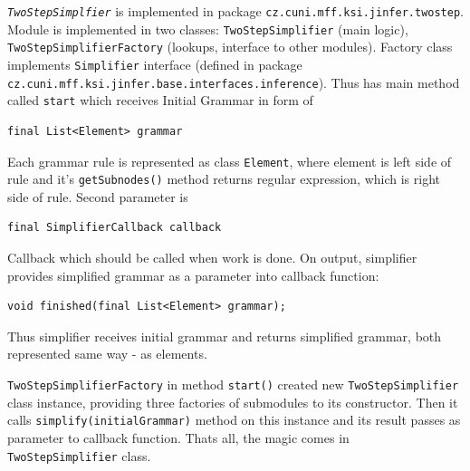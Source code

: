 \documentclass[a4paper,10pt,oneside]{article}
\newcommand{\code}[1]{\texttt{#1}}
\newcommand{\jmodule}[1]{\texttt{\textit{#1}}}
\begin{document}
\jmodule{TwoStepSimplfier} is implemented in package \code{cz.cuni.mff.ksi.jinfer.twostep}.
Module is implemented in two classes: \code{TwoStepSimplifier} (main logic), \code{TwoStepSimplifierFactory} (lookups, interface to other modules).
Factory class implements \code{Simplifier} interface (defined in package \code{cz.cuni.mff.ksi.jinfer.base.interfaces.inference}).
Thus has main method called \code{start} which receives Initial Grammar in form of
\begin{verbatim}
final List<Element> grammar
\end{verbatim}
Each grammar rule is represented as class \code{Element}, where element is left side of rule and it's \code{getSubnodes()} method
returns regular expression, which is right side of rule.
Second parameter is 
\begin{verbatim}
final SimplifierCallback callback
\end{verbatim}
Callback which should be called when work is done.
On output, simplifier provides simplified grammar as a parameter into callback function:
\begin{verbatim}
void finished(final List<Element> grammar);
\end{verbatim}
Thus simplifier receives initial grammar and returns simplified grammar, both represented same way - as elements.

\code{TwoStepSimplifierFactory} in method \code{start()} created new \code{TwoStepSimplifier} class instance, providing three factories of submodules to its constructor.
Then it calls \code{simplify(initialGrammar)} method on this instance and its result passes as parameter to callback function.
Thats all, the magic comes in \code{TwoStepSimplifier} class.
\end{document}
